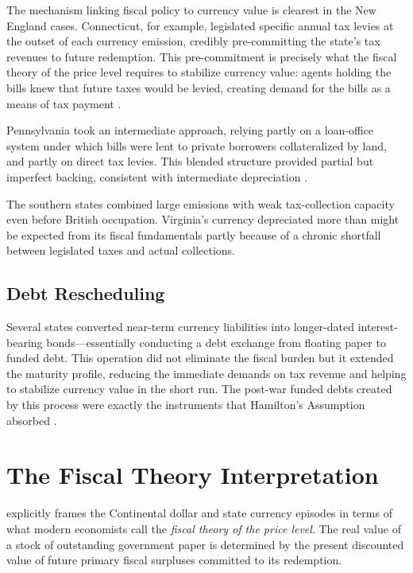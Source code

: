 \documentclass[12pt]{article}
\begin{document}
The mechanism linking fiscal policy to currency value is clearest in the
New England cases.  Connecticut, for example, legislated specific annual
tax levies at the outset of each currency emission, credibly pre-committing
the state's tax revenues to future redemption.  This pre-commitment is
precisely what the fiscal theory of the price level requires to stabilize
currency value: agents holding the bills knew that future taxes would
be levied, creating demand for the bills as a means of tax payment
\citep{Grubb2016, Smith1985}.

Pennsylvania took an intermediate approach, relying partly on a loan-office
system under which bills were lent to private borrowers collateralized by
land, and partly on direct tax levies.  This blended structure provided
partial but imperfect backing, consistent with intermediate depreciation
\citep{Perkins1994}.

The southern states combined large emissions with weak tax-collection
capacity even before British occupation.  Virginia's currency depreciated
more than might be expected from its fiscal fundamentals partly because of
a chronic shortfall between legislated taxes and actual collections.

\subsection{Debt Rescheduling}

Several states converted near-term currency liabilities into longer-dated
interest-bearing bonds---essentially conducting a debt exchange from
floating paper to funded debt.  This operation did not eliminate the fiscal
burden but it extended the maturity profile, reducing the immediate demands
on tax revenue and helping to stabilize currency value in the short run.
The post-war funded debts created by this process were exactly the instruments
that Hamilton's Assumption absorbed \citep{Ferguson1961}.

\section{The Fiscal Theory Interpretation}

\citet{Grubb2008, Grubb2012, Grubb2003} explicitly frames the Continental
dollar and state currency episodes in terms of what modern economists call
the \emph{fiscal theory of the price level}.  The real value of a stock of
outstanding government paper is determined by the present discounted value
of future primary fiscal surpluses committed to its redemption.
\end{document}
